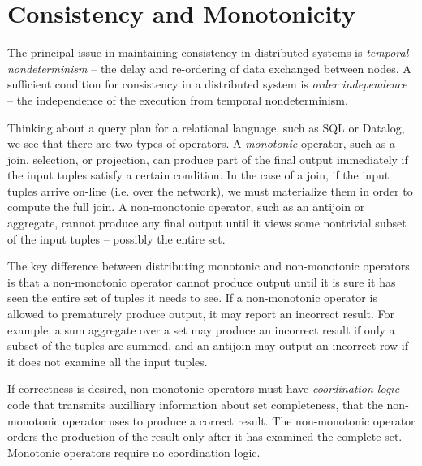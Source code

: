 \section{Consistency and Monotonicity}

The principal issue in maintaining consistency in distributed systems is {\em
temporal nondeterminism} -- the delay and re-ordering of data exchanged between
nodes.  A sufficient condition for consistency in a distributed system is {\em
order independence} -- the independence of the execution from temporal
nondeterminism.


Thinking about a query plan for a relational language, such as SQL or Datalog,
we see that there are two types of operators.  A {\em monotonic} operator, such
as a join, selection, or projection, can produce part of the final output
immediately if the input tuples satisfy a certain condition.  In the case of a
join, if the input tuples arrive on-line (i.e. over the network), we must
materialize them in order to compute the full join.  A non-monotonic operator,
such as an antijoin or aggregate, cannot produce any final output until it
views some nontrivial subset of the input tuples -- possibly the entire set.

The key difference between distributing monotonic and non-monotonic operators
is that a non-monotonic operator cannot produce output until it is sure it has
seen the entire set of tuples it needs to see.  If a non-monotonic operator is
allowed to prematurely produce output, it may report an incorrect result.  For
example, a sum aggregate over a set may produce an incorrect result if only a
subset of the tuples are summed, and an antijoin may output an incorrect row if
it does not examine all the input tuples.

If correctness is desired, non-monotonic operators must have {\em coordination
logic} -- code that transmits auxilliary information about set completeness,
that the non-monotonic operator uses to produce a correct result.  The
non-monotonic operator orders the production of the result only after it has
examined the complete set.  
Monotonic operators require no coordination logic.

